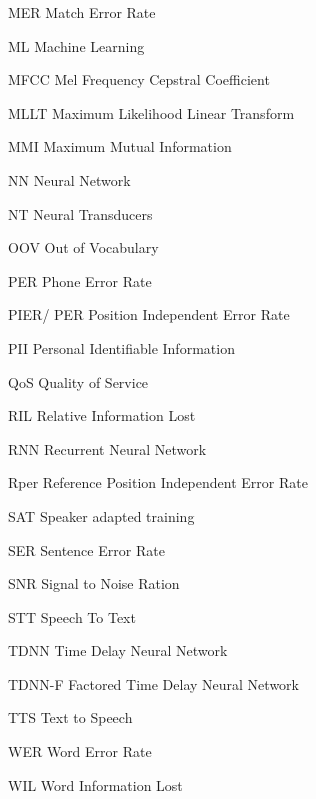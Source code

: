 \begin{acronyms}
    \item [MER] Match Error Rate
    \item[ML] Machine Learning
    \item[MFCC] Mel Frequency Cepstral Coefficient
    \item [MLLT] Maximum Likelihood Linear Transform
    \item [MMI] Maximum Mutual Information 
    \item[NN] Neural Network
    \item [NT] Neural Transducers 
    \item [OOV] Out of Vocabulary
    \item [PER] Phone Error Rate
    \item [PIER/ PER] Position Independent Error Rate
    \item [PII] Personal Identifiable Information
    \item [QoS] Quality of Service
    \item [RIL] Relative Information Lost
    \item [RNN] Recurrent Neural Network
    \item [Rper] Reference Position Independent Error Rate
    \item [SAT] Speaker adapted training
    \item [SER] Sentence Error Rate
    \item [SNR] Signal to Noise Ration
    \item [STT] Speech To Text
    \item [TDNN] Time Delay Neural Network
    \item [TDNN-F] Factored Time Delay Neural Network
    \item [TTS] Text to Speech
    \item [WER] Word Error Rate
    \item [WIL] Word Information Lost
    
    \end{acronyms}
        
        
        
        
         